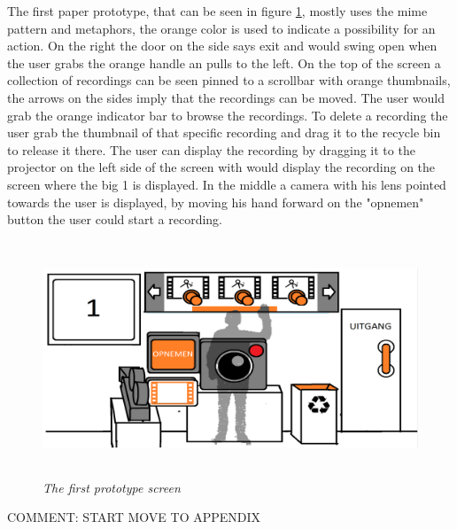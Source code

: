 The first paper prototype, that can be seen in figure \ref{first prototype}, mostly uses the mime pattern and metaphors, the orange color is used to indicate a possibility for an action. On the right the door on the side says exit and would swing open when the user grabs the orange handle an pulls to the left. On the top of the screen a collection of recordings can be seen pinned to a scrollbar with orange thumbnails, the arrows on the sides imply that the recordings can be moved. The user would grab the orange indicator bar to browse the recordings. To delete a recording the user grab the thumbnail of that specific recording and drag it to the recycle bin to release it there. The user can display the recording by dragging it to the projector on the left side of the screen with would display the recording on the screen where the big 1 is displayed. In the middle a camera with his lens pointed towards the user is displayed, by moving his hand forward on the "opnemen" button the user could start a recording.

\begin{figure}[H]
	\begin{center}
		\includegraphics[width=12.5cm, height=7cm]{figures/prototype_1_1_standard.png}
		\caption{\emph{The first prototype screen}}
		\label{first prototype}
	\end{center}
\end{figure}

{\large COMMENT: START MOVE TO APPENDIX}

